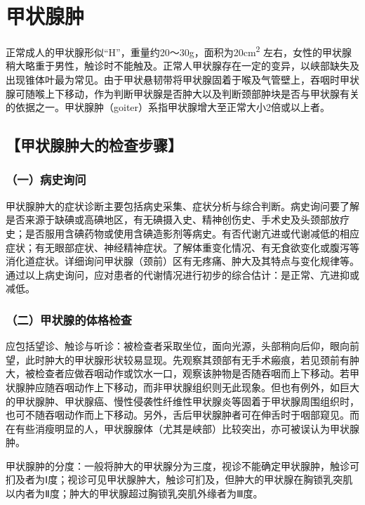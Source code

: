 \chapter{甲状腺肿}

正常成人的甲状腺形似“H”，重量约20～30g，面积为20cm\textsuperscript{2}
左右，女性的甲状腺稍大略重于男性，触诊时不能触及。正常人甲状腺存在一定的变异，以峡部缺失及出现锥体叶最为常见。由于甲状悬韧带将甲状腺固着于喉及气管壁上，吞咽时甲状腺可随喉上下移动，作为判断甲状腺是否肿大以及判断颈部肿块是否与甲状腺有关的依据之一。甲状腺肿（goiter）系指甲状腺增大至正常大小2倍或以上者。

\section{【甲状腺肿大的检查步骤】}

\subsection{（一）病史询问}

甲状腺肿大的症状诊断主要包括病史采集、症状分析与综合判断。病史询问要了解是否来源于缺碘或高碘地区，有无碘摄入史、精神创伤史、手术史及头颈部放疗史；是否服用含碘药物或使用含碘造影剂等病史。有否代谢亢进或代谢减低的相应症状；有无眼部症状、神经精神症状。了解体重变化情况、有无食欲变化或腹泻等消化道症状。详细询问甲状腺（颈前）区有无疼痛、肿大及其特点与变化规律等。通过以上病史询问，应对患者的代谢情况进行初步的综合估计：是正常、亢进抑或减低。

\subsection{（二）甲状腺的体格检查}

应包括望诊、触诊与听诊：被检查者采取坐位，面向光源，头部稍向后仰，眼向前望，此时肿大的甲状腺形状较易显现。先观察其颈部有无手术瘢痕，若见颈前有肿大，被检查者应做吞咽动作或饮水一口，观察该肿物是否随吞咽而上下移动。若甲状腺肿应随吞咽动作上下移动，而非甲状腺组织则无此现象。但也有例外，如巨大的甲状腺肿、甲状腺癌、慢性侵袭性纤维性甲状腺炎等固着于甲状腺周围组织时，也可不随吞咽动作而上下移动。另外，舌后甲状腺肿者可在伸舌时于咽部窥见。而在有些消瘦明显的人，甲状腺腺体（尤其是峡部）比较突出，亦可被误认为甲状腺肿。

甲状腺肿的分度：一般将肿大的甲状腺分为三度，视诊不能确定甲状腺肿，触诊可扪及者为Ⅰ度；视诊可见甲状腺肿大，触诊可扪及，但肿大的甲状腺在胸锁乳突肌以内者为Ⅱ度；肿大的甲状腺超过胸锁乳突肌外缘者为Ⅲ度。

